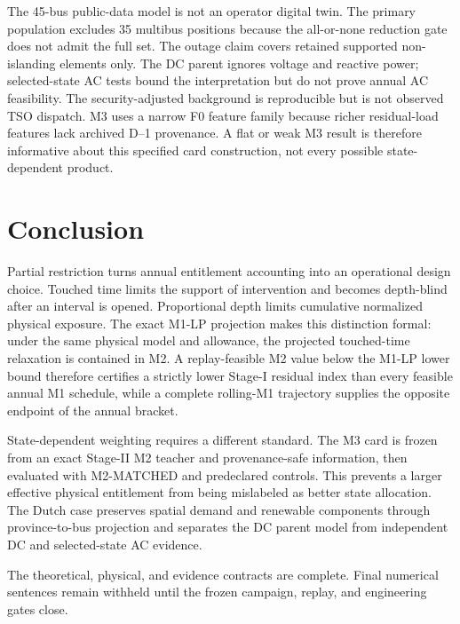 \documentclass[10pt,journal]{IEEEtran}
\newif\ifFinalResultsReady
\providecommand{\HeldMTwoS}{--}
\providecommand{\HeldMOneLower}{--}
\providecommand{\HeldMOneUpper}{--}
\begin{document}
The 45-bus public-data model is not an operator digital twin. The primary population excludes 35 multibus positions because the all-or-none reduction gate does not admit the full set. The outage claim covers retained supported non-islanding elements only. The DC parent ignores voltage and reactive power; selected-state AC tests bound the interpretation but do not prove annual AC feasibility. The security-adjusted background is reproducible but is not observed TSO dispatch. M3 uses a narrow F0 feature family because richer residual-load features lack archived D--1 provenance. A flat or weak M3 result is therefore informative about this specified card construction, not every possible state-dependent product.

\section{Conclusion}
\label{sec:conclusion}

Partial restriction turns annual entitlement accounting into an operational design choice. Touched time limits the support of intervention and becomes depth-blind after an interval is opened. Proportional depth limits cumulative normalized physical exposure. The exact M1-LP projection makes this distinction formal: under the same physical model and allowance, the projected touched-time relaxation is contained in M2. A replay-feasible M2 value below the M1-LP lower bound therefore certifies a strictly lower Stage-I residual index than every feasible annual M1 schedule, while a complete rolling-M1 trajectory supplies the opposite endpoint of the annual bracket.

State-dependent weighting requires a different standard. The M3 card is frozen from an exact Stage-II M2 teacher and provenance-safe information, then evaluated with M2-MATCHED and predeclared controls. This prevents a larger effective physical entitlement from being mislabeled as better state allocation. The Dutch case preserves spatial demand and renewable components through province-to-bus projection and separates the DC parent model from independent DC and selected-state AC evidence.

\ifFinalResultsReady
The final numerical conclusion is inserted from the claim-gated artifacts: the held-out M2 value is \HeldMTwoS\ MW h row-state, the annual M1 interval is $[\HeldMOneLower,\HeldMOneUpper]$, and the M3 matched-exposure outcome is reported without changing its sign or scale.
\else
The theoretical, physical, and evidence contracts are complete. Final numerical sentences remain withheld until the frozen campaign, replay, and engineering gates close.
\fi



\end{document}
